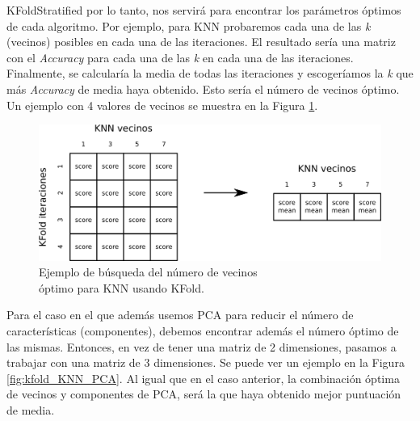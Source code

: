 KFoldStratified por lo tanto, nos servirá para encontrar los parámetros óptimos de cada algoritmo. Por ejemplo, para KNN probaremos cada una de las \textit{k} (vecinos) posibles en cada una de las iteraciones. El resultado sería una matriz con el \textit{Accuracy} para cada una de las \textit{k} en cada una de las iteraciones. Finalmente, se calcularía la media de todas las iteraciones y escogeríamos la \textit{k} que más \textit{Accuracy} de media haya obtenido. Esto sería el número de vecinos óptimo. Un ejemplo con 4 valores de vecinos se muestra en la Figura \ref{fig:kfold_KNN}.\\

\begin{figure} [h!]
  \begin{center}
    \includegraphics[width=13cm]{figs/KFold_KNN.png}
  \end{center}
  \captionsetup{justification=centering}
  \caption{Ejemplo de búsqueda del número de vecinos\\
  óptimo para KNN usando KFold.}
  \label{fig:kfold_KNN}
\end{figure}

Para el caso en el que además usemos PCA para reducir el número de características (componentes), debemos encontrar además el número óptimo de las mismas. Entonces, en vez de tener una matriz de 2 dimensiones, pasamos a trabajar con una matriz de 3 dimensiones. Se puede ver un ejemplo en la Figura \ref{fig:kfold_KNN_PCA}. Al igual que en el caso anterior, la combinación óptima de vecinos y componentes de PCA, será la que haya obtenido mejor puntuación de media.\\

